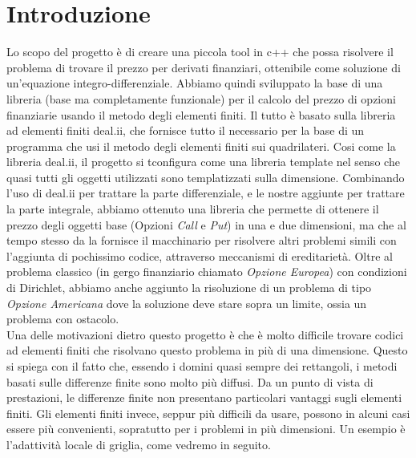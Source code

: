 \documentclass[a4paper,10pt]{report}
\theoremstyle{plain}
\theoremstyle{definition}
\theoremstyle{remark}
\begin{document}
	\clearpage
	\thispagestyle{empty}
	
	\clearpage

\clearpage
\thispagestyle{plain}
\par\vspace*{.35\textheight}{\raggedleft An approximate answer to the right problem is worth a good deal more than an exact answer to an approximate problem.\par}
\par\vspace{1cm}{\raggedleft John Tukey\par}

\tableofcontents
\listoftodos

\chapter*{Introduzione}

Lo scopo del progetto è di creare una piccola tool in \textsf{c++} che possa risolvere il problema di trovare il prezzo per derivati finanziari, ottenibile come soluzione di un'equazione integro-differenziale. Abbiamo quindi sviluppato la base di una libreria (base ma completamente funzionale) per il calcolo del prezzo di opzioni finanziarie usando il metodo degli elementi finiti. Il tutto è basato sulla libreria ad elementi finiti \textsf{deal.ii}, che fornisce tutto il necessario per la base di un programma che usi il metodo degli elementi finiti sui quadrilateri. Cosi come la libreria \textsf{deal.ii}, il progetto si tconfigura come una libreria template nel senso che quasi tutti gli oggetti utilizzati sono templatizzati sulla dimensione. Combinando l'uso di \textsf{deal.ii} per trattare la parte differenziale, e le nostre aggiunte per trattare la parte integrale, abbiamo ottenuto una libreria che permette di ottenere il prezzo degli oggetti base (Opzioni \emph{Call} e \emph{Put}) in una e due dimensioni, ma che al tempo stesso da la fornisce il macchinario per risolvere altri problemi simili con l'aggiunta di pochissimo codice, attraverso meccanismi di ereditarietà. Oltre al problema classico (in gergo finanziario chiamato \emph{Opzione Europea}) con condizioni di Dirichlet, abbiamo anche aggiunto la risoluzione di un problema di tipo \emph{Opzione Americana} dove la soluzione deve stare sopra un limite, ossia un problema con ostacolo.\\ 

Una delle motivazioni dietro questo progetto è che è molto difficile trovare codici ad elementi finiti che risolvano questo problema in più di una dimensione. Questo si spiega con il fatto che, essendo i domini quasi sempre dei rettangoli, i metodi basati sulle differenze finite sono molto più diffusi. Da un punto di vista di prestazioni, le differenze finite non presentano particolari vantaggi sugli elementi finiti. Gli elementi finiti invece, seppur più difficili da usare, possono in alcuni casi essere più convenienti, sopratutto per i problemi in più dimensioni. Un esempio è l'adattività locale di griglia, come vedremo in seguito.
\end{document}
